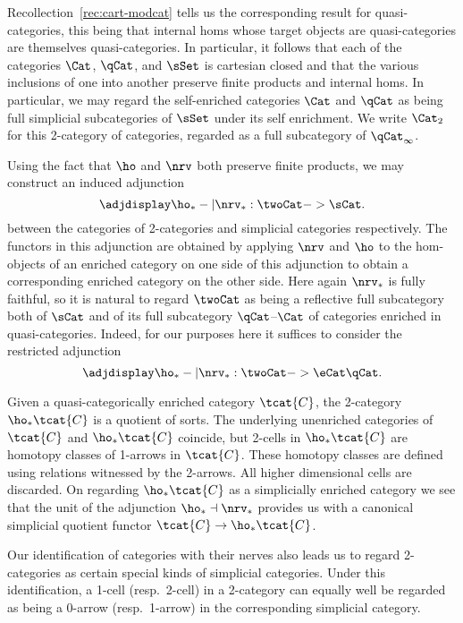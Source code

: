 Recollection~\ref{rec:cart-modcat} tells us the corresponding result for quasi-categories, this being that internal homs whose target objects are quasi-categories are themselves quasi-categories. In particular, it follows that each of the categories $\Cat$, $\qCat$, and $\sSet$ is cartesian closed and that the various inclusions of one into another preserve finite products and internal homs. In particular, we may regard the self-enriched categories $\Cat$ and $\qCat$ as being full simplicial subcategories of $\sSet$ under its self enrichment.  We write $\Cat_2$ for this 2-category of categories, regarded as a full subcategory of $\qCat_\infty$. 


\begin{obs}\label{obs:simp-to-2-cats}
Using the fact that $\ho$ and $\nrv$ both preserve finite products, we may construct an induced adjunction
	\begin{equation*}
		\adjdisplay \ho_*-|\nrv_*:\twoCat->\sCat. 
	\end{equation*}
	between the categories of 2-categories and simplicial categories respectively. The functors in this adjunction are obtained by applying $\nrv$ and $\ho$  to the hom-objects of an enriched category on one side of this adjunction to obtain a corresponding enriched category on the other side. Here again $\nrv_*$ is fully faithful, so it is natural to regard $\twoCat$ as being a reflective full subcategory both of $\sCat$ and of its full subcategory $\qCat$--$\Cat$ of categories enriched in quasi-categories. Indeed, for our purposes here it suffices to consider the restricted adjunction \[ \adjdisplay \ho_* -| \nrv_* : \twoCat -> \eCat\qCat.\] 

Given a quasi-categorically enriched category $\tcat{C}$, the 2-category $\ho_*\tcat{C}$ is a quotient of sorts. The underlying unenriched categories of $\tcat{C}$ and $\ho_*\tcat{C}$ coincide, but 2-cells in $\ho_*\tcat{C}$ are homotopy classes of 1-arrows in $\tcat{C}$. These homotopy classes are defined using relations witnessed by the 2-arrows. All higher dimensional cells are discarded. On regarding $\ho_*\tcat{C}$ as a simplicially enriched category we see that the unit of the adjunction $\ho_*\dashv\nrv_*$ provides us with a canonical simplicial quotient functor $\tcat{C}\to\ho_*\tcat{C}$.
\end{obs}

  Our identification of categories with their nerves also leads us to regard 2-categories as certain special kinds of simplicial categories. Under this identification, a 1-cell (resp.\ 2-cell) in a 2-category can equally well be regarded as being a 0-arrow (resp.\ 1-arrow) in the corresponding simplicial category.  

